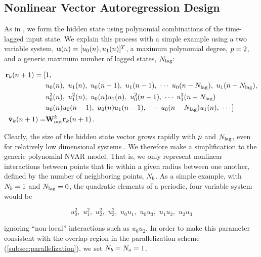 \subsection{Nonlinear Vector Autoregression Design}
\label{subsec:nvar}

As in \citet{gauthier_next_2021,chen_next_2022}, we form the hidden state using
polynomial combinations of the time-lagged input state.
We explain this process with a simple example using a two variable system,
$\mathbf{u}(n) = [u_0(n), u_1(n)]^T$,
a maximum polynomial degree,
$p=2$, and a generic maximum number of lagged states, $N_\text{lag}$:
\begin{linenomath*}\begin{equation}
    \begin{aligned}
        \mathbf{r}_{k}(n+1)
        =
        [&1, \\
         &u_0(n), \,\, u_1(n), \,\,
        u_0(n-1),\,\, u_1(n-1), \,\,
        \cdots \,\,
        u_0(n-N_\text{lag}), \,\, u_1(n-N_\text{lag}), \\
         &u_0^2(n), \,\, u_1^2(n), \,\, u_0(n)u_1(n), \,\,
        u_0^2(n-1), \,\, \cdots \,\, u_1^2(n-N_\text{lag}) \\
         &u_0(n)u_0(n-1), \,\,
        u_0(n)u_1(n-1), \,\, \cdots \,\, u_0(n-N_\text{lag})u_1(n), \,\,\cdots
        ] \\
        \hat{\mathbf{v}}_{k}(n+1) = &\mathbf{W}_\text{out}^{k} \mathbf{r}_{k}(n+1) \, .
    \end{aligned}
\end{equation}\end{linenomath*}
Clearly, the size of the hidden state vector grows rapidly with
$p$ and $N_\text{lag}$,
even for relatively low dimensional systems
\citep<see supplemental material of>[for explicit calculations]{chen_next_2022}.
We therefore make a simplification to the generic polynomial NVAR model.
That is, we only represent nonlinear interactions between points that lie
within a given radius between one another, defined by the number of neighboring
points, $N_{b}$.
As a simple example, with $N_{b}=1$ and $N_\text{lag}=0$, the quadratic elements of a periodic, four variable
system would be
\begin{linenomath*}\begin{equation*}
    u_0^2, \,\, u_1^2, \,\, u_2^2, \,\, u_3^2, \,\,
    u_0u_1, \,\, u_0u_3, \,\, u_1u_2, \,\, u_2u_3
\end{equation*}\end{linenomath*}
ignoring ``non-local'' interactions such as $u_0u_2$.
In order to make this parameter consistent with the overlap region in the
parallelization scheme (\cref{subsec:parallelization}),
we set $N_{b} = N_{o} = 1$.

